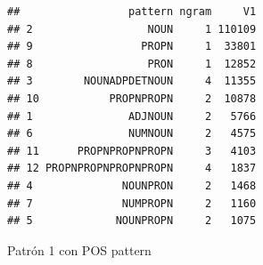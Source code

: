 \documentclass[]{article}
\newenvironment{Shaded}{\begin{snugshade}}{\end{snugshade}}
\newcommand{\CommentTok}[1]{\textcolor[rgb]{0.56,0.35,0.01}{\textit{#1}}}
\newcommand{\DataTypeTok}[1]{\textcolor[rgb]{0.13,0.29,0.53}{#1}}
\newcommand{\KeywordTok}[1]{\textcolor[rgb]{0.13,0.29,0.53}{\textbf{#1}}}
\newcommand{\NormalTok}[1]{#1}
\newcommand{\OperatorTok}[1]{\textcolor[rgb]{0.81,0.36,0.00}{\textbf{#1}}}
\newcommand{\StringTok}[1]{\textcolor[rgb]{0.31,0.60,0.02}{#1}}
\begin{document}
\begin{verbatim}
##                 pattern ngram     V1
## 2                  NOUN     1 110109
## 9                 PROPN     1  33801
## 8                  PRON     1  12852
## 3        NOUNADPDETNOUN     4  11355
## 10           PROPNPROPN     2  10878
## 1               ADJNOUN     2   5766
## 6               NUMNOUN     2   4575
## 11      PROPNPROPNPROPN     3   4103
## 12 PROPNPROPNPROPNPROPN     4   1837
## 4              NOUNPRON     2   1468
## 7              NUMPROPN     2   1160
## 5             NOUNPROPN     2   1075
\end{verbatim}

Patrón 1 con POS pattern

\begin{Shaded}
\end{Shaded}
\end{document}
